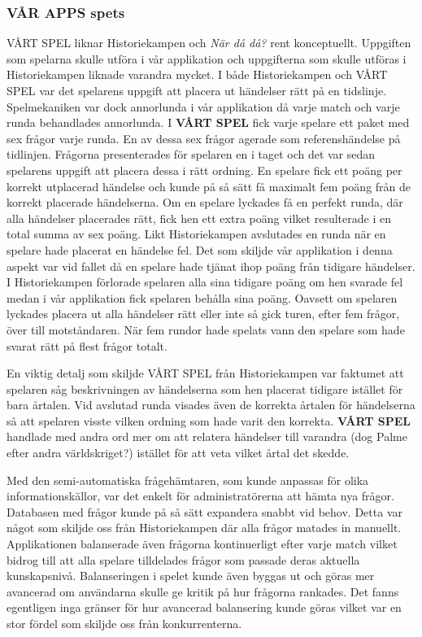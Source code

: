 \documentclass[a4paper, 11pt]{article}
\begin{document}
\subsubsection{VÅR APPS spets}
VÅRT SPEL liknar Historiekampen och \textit{När då då?} rent konceptuellt. Uppgiften som spelarna skulle utföra i vår applikation och uppgifterna som skulle utföras i Historiekampen liknade varandra mycket. I både Historiekampen och VÅRT SPEL var det spelarens uppgift att placera ut händelser rätt på en tidslinje. Spelmekaniken var dock annorlunda i vår applikation då varje match och varje runda behandlades annorlunda. I \textbf{VÅRT SPEL} fick varje spelare ett paket med sex frågor varje runda. En av dessa sex frågor agerade som referenshändelse på tidlinjen. Frågorna presenterades för spelaren en i taget och det var sedan spelarens uppgift att placera dessa i rätt ordning. En spelare fick ett poäng per korrekt utplacerad händelse och kunde på så sätt få maximalt fem poäng från de korrekt placerade händelserna. Om en spelare lyckades få en perfekt runda, där alla händelser placerades rätt, fick hen ett extra poäng vilket resulterade i en total summa av sex poäng. Likt Historiekampen avslutades en runda när en spelare hade placerat en händelse fel. Det som skiljde vår applikation i denna aspekt var vid fallet då en spelare hade tjänat ihop poäng från tidigare händelser. I Historiekampen förlorade spelaren alla sina tidigare poäng om hen svarade fel medan i vår applikation fick spelaren behålla sina poäng. Oavsett om spelaren lyckades placera ut alla händelser rätt eller inte så gick turen, efter fem frågor, över till motståndaren. När fem rundor hade spelats vann den spelare som hade svarat rätt på flest frågor totalt.  

En viktig detalj som skiljde VÅRT SPEL från Historiekampen var faktumet att spelaren såg beskrivningen av händelserna som hen placerat tidigare istället för bara årtalen. Vid avslutad runda visades även de korrekta årtalen för händelserna så att spelaren visste vilken ordning som hade varit den korrekta. \textbf{VÅRT SPEL} handlade med andra ord mer om att relatera händelser till varandra (dog Palme efter andra världskriget?) istället för att veta vilket årtal det skedde.

Med den semi-automatiska frågehämtaren, som kunde anpassas för olika informationskällor, var det enkelt för administratörerna att hämta nya frågor. Databasen med frågor kunde på så sätt expandera snabbt vid behov. Detta var något som skiljde oss från Historiekampen där alla frågor matades in manuellt. \\
Applikationen balanserade även frågorna kontinuerligt efter varje match vilket bidrog till att alla spelare tilldelades frågor som passade deras aktuella kunskapsnivå. Balanseringen i spelet kunde även byggas ut och göras mer avancerad om användarna skulle ge kritik på hur frågorna rankades. Det fanns egentligen inga gränser för hur avancerad balansering kunde göras vilket var en stor fördel som skiljde oss från konkurrenterna.
\end{document}
